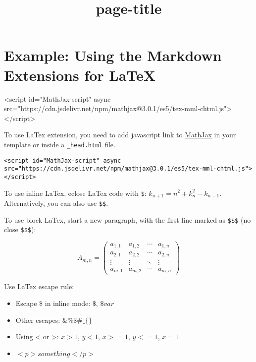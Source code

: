 \documentclass{article}
\title{{page-title}}
\date{}
\begin{document}
\maketitle


\section*{Example: Using the Markdown Extensions for LaTeX}



<script id="MathJax-script" async src="https://cdn.jsdelivr.net/npm/mathjax@3.0.1/es5/tex-mml-chtml.js"></script>


To use LaTex extension, you need to add javascript
link to \href{http://www.mathjax.org/}{MathJax} in
your template or inside a \texttt{\_head.html} file.
\begin{lstlisting}
<script id="MathJax-script" async src="https://cdn.jsdelivr.net/npm/mathjax@3.0.1/es5/tex-mml-chtml.js"></script>

\end{lstlisting}


To use inline LaTex, eclose LaTex code with \texttt{\$}:
$k_{n+1} = n^2 + k_n^2 - k_{n-1}$. Alternatively,
you can also use \texttt{\$\$}.


To use block LaTex, start a new paragraph, with
the first line marked as \texttt{\$\$\$} (no close \texttt{\$\$\$}):


\begin{equation}
A_{m,n} =
 \begin{pmatrix}
  a_{1,1} & a_{1,2} & \cdots & a_{1,n} \\
  a_{2,1} & a_{2,2} & \cdots & a_{2,n} \\
  \vdots  & \vdots  & \ddots & \vdots  \\
  a_{m,1} & a_{m,2} & \cdots & a_{m,n}
 \end{pmatrix}
\end{equation}




Use LaTex escape rule:
\begin{itemize}
\item Escape \$ in inline mode: $\$$, $\$var$

\item Other escapes: $\& \% \$ \# \_ \{ \}$

\item Using < or >: $x > 1$, $y < 1$, $x >= 1$,
$y <= 1$, $x = 1$

\item $<p>something</p>$

\end{itemize}
\end{document}
